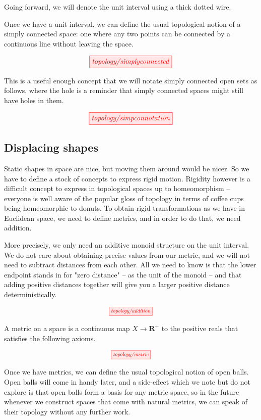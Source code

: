 \begin{fullwidth}
Going forward, we will denote the unit interval using a thick dotted wire.


Once we have a unit interval, we can define the usual topological notion of a simply connected space: one where any two points can be connected by a continuous line without leaving the space.

\[\tikzfig{topology/simplyconnected}\]

This is a useful enough concept that we will notate simply connected open sets as follows, where the hole is a reminder that simply connected spaces might still have holes in them.

\[\tikzfig{topology/simpconnotation}\]

\subsection{Displacing shapes}\label{sec:displace}

Static shapes in space are nice, but moving them around would be nicer. So we have to define a stock of concepts to express rigid motion. Rigidity however is a difficult concept to express in topological spaces up to homeomorphism -- everyone is well aware of the popular gloss of topology in terms of coffee cups being homeomorphic to donuts. To obtain rigid transformations as we have in Euclidean space, we need to define metrics, and in order to do that, we need addition.


More precisely, we only need an additive monoid structure on the unit interval. We do not care about obtaining precise values from our metric, and we will not need to subtract distances from each other. All we need to know is that the lower endpoint stands in for "zero distance" -- as the unit of the monoid -- and that adding positive distances together will give you a larger positive distance deterministically.

\[\scalebox{0.75}{\tikzfig{topology/addition}}\]


A metric on a space is a continuous map $X \rightarrow \mathbf{R}^+$ to the positive reals that satisfies the following axioms.

\[\scalebox{0.75}{\tikzfig{topology/metric}}\]


Once we have metrics, we can define the usual topological notion of open balls. Open balls will come in handy later, and a side-effect which we note but do not explore is that open balls form a basis for any metric space, so in the future whenever we construct spaces that come with natural metrics, we can speak of their topology without any further work.


\end{fullwidth}
